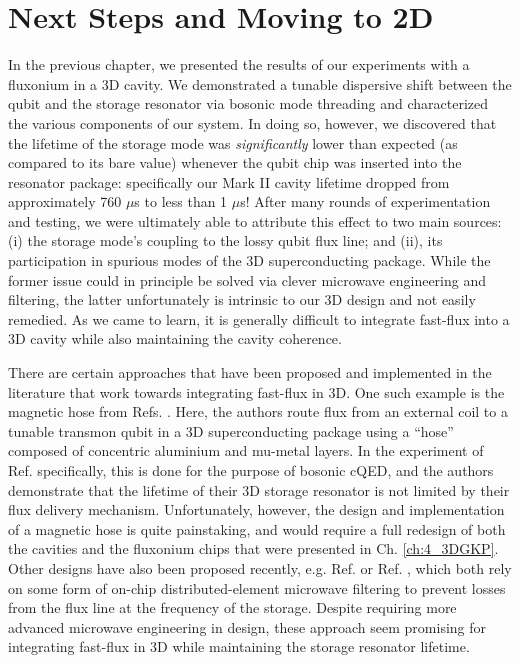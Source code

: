 \chapter{Next Steps and Moving to 2D\label{ch:5_2DGKP}}


In the previous chapter, we presented the results of our experiments with a fluxonium in a 3D cavity. We demonstrated a tunable dispersive shift between the qubit and the storage resonator via bosonic mode threading and characterized the various components of our system. In doing so, however, we discovered that the lifetime of the storage mode was \textit{significantly} lower than expected (as compared to its bare value) whenever the qubit chip was inserted into the resonator package: specifically our Mark II cavity lifetime dropped from approximately 760 $\mu$s to less than 1 $\mu$s! After many rounds of experimentation and testing, we were ultimately able to attribute this effect to two main sources: (i) the storage mode's coupling to the lossy qubit flux line; and (ii), its participation in spurious modes of the 3D superconducting package. While the former issue could in principle be solved via clever microwave engineering and filtering, the latter unfortunately is intrinsic to our 3D design and not easily remedied. As we came to learn, it is generally difficult to integrate fast-flux into a 3D cavity while also maintaining the cavity coherence. 

There are certain approaches that have been proposed and implemented in the literature that work towards integrating fast-flux in 3D. One such example is the magnetic hose from Refs. \cite{gargiulo2021fast,valadares2023demand}. Here, the authors route flux from an external coil to a tunable transmon qubit in a 3D superconducting package using a ``hose'' composed of concentric aluminium and mu-metal layers. In the experiment of Ref. \cite{valadares2023demand} specifically, this is done for the purpose of bosonic cQED, and the authors demonstrate that the lifetime of their 3D storage resonator is not limited by their flux delivery mechanism. Unfortunately, however, the design and implementation of a magnetic hose is quite painstaking, and would require a full redesign of both the cavities and the fluxonium chips that were presented in Ch. \ref{ch:4_3DGKP}. Other designs have also been proposed recently, e.g. Ref. \cite{hutin2024monitoring} or Ref. \cite{maiti2024ancilla}, which both rely on some form of on-chip distributed-element microwave filtering to prevent losses from the flux line at the frequency of the storage. Despite requiring more advanced microwave engineering in design, these approach seem promising for integrating fast-flux in 3D while maintaining the storage resonator lifetime. 

